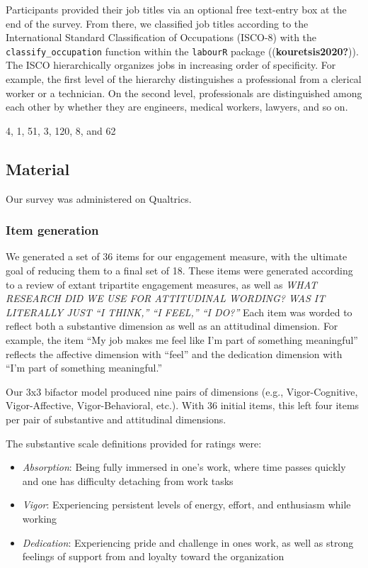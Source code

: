 \documentclass[
  english,
  man]{apa6}
\begin{document}
Participants provided their job titles via an optional free text-entry box at the end of the survey. From there, we classified job titles according to the International Standard Classification of Occupations (ISCO-8) with the \texttt{classify\_occupation} function within the \texttt{labourR} package ((\textbf{kouretsis2020?})). The ISCO hierarchically organizes jobs in increasing order of specificity. For example, the first level of the hierarchy distinguishes a professional from a clerical worker or a technician. On the second level, professionals are distinguished among each other by whether they are engineers, medical workers, lawyers, and so on.

4, 1, 51, 3, 120, 8, and 62

\hypertarget{material}{%
\subsection{Material}\label{material}}

Our survey was administered on Qualtrics.

\hypertarget{item-generation}{%
\subsubsection{Item generation}\label{item-generation}}

We generated a set of 36 items for our engagement measure, with the ultimate goal of reducing them to a final set of 18. These items were generated according to a review of extant tripartite engagement measures, as well as \emph{WHAT RESEARCH DID WE USE FOR ATTITUDINAL WORDING? WAS IT LITERALLY JUST ``I THINK,'' ``I FEEL,'' ``I DO?''} Each item was worded to reflect both a substantive dimension as well as an attitudinal dimension. For example, the item ``My job makes me feel like I'm part of something meaningful'' reflects the affective dimension with ``feel'' and the dedication dimension with ``I'm part of something meaningful.''

Our 3x3 bifactor model produced nine pairs of dimensions (e.g., Vigor-Cognitive, Vigor-Affective, Vigor-Behavioral, etc.). With 36 initial items, this left four items per pair of substantive and attitudinal dimensions.

The substantive scale definitions provided for ratings were:

\begin{itemize}
\item
  \emph{Absorption}: Being fully immersed in one's work, where time passes quickly and one has difficulty detaching from work tasks
\item
  \emph{Vigor}: Experiencing persistent levels of energy, effort, and enthusiasm while working
\item
  \emph{Dedication}: Experiencing pride and challenge in ones work, as well as strong feelings of support from and loyalty toward the organization
\end{itemize}
\end{document}
